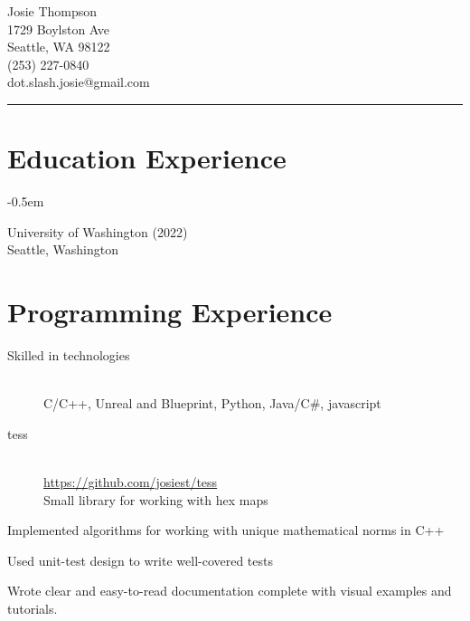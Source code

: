 \documentclass[10pt]{article}
\newenvironment{itemize*}
{\begin{itemize}[leftmargin=*]
    \setlength{\parskip}{0.5pt}}
{\end{itemize}}
\begin{document}
\noindent
\parbox[t]{0.5\textwidth}{
    {\sffamily\Huge Josie Thompson}\medskip\\
    1729 Boylston Ave\\
    Seattle, WA 98122\\
    (253) 227-0840\\
    dot.slash.josie@gmail.com
}
\vspace{12pt}
\hrule


\begin{paracol}{2}
\section*{Education Experience}
\begin{description}
\itemsep -0.5em
\item[B.S. in Computer Science]
    University of Washington (2022)\\
    Seattle, Washington\\
\end{description}

\section*{Programming Experience}
\begin{description}
\item[Skilled in technologies] \hfill \\
C/C++, Unreal and Blueprint, Python, Java/C\#, javascript
\end{description}

\begin{description}
\item[tess] \hfill \\
    \url{https://github.com/josiest/tess}\\
    Small library for working with hex maps
\end{description}
\begin{itemize*}
\item Implemented algorithms for working with unique mathematical norms in C++
\item Used unit-test design to write well-covered tests
\item Wrote clear and easy-to-read documentation complete with visual examples
      and tutorials.
\end{itemize*}


\end{paracol}
\end{document}
